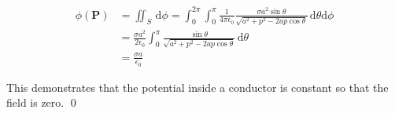 \documentclass[12pt]{article}
\begin{document}
\begin{equation}
\begin{split}
    \phi(\mathbf{P}) &= \iint_{S} \, \mathrm{d}\phi = \int_{0}^{2\pi} \int_{0}^{\pi} \frac{1}{4\pi\epsilon_{0}} \frac{\sigma a^{2} \sin{\theta}}{\sqrt{a^{2} + p^{2} - 2ap\cos{\theta}}} \, \mathrm{d}\theta \mathrm{d}\phi \\
    &= \frac{\sigma a^{2}}{2\epsilon_{0}} \int_{0}^{\pi} \frac{\sin{\theta}}{\sqrt{a^{2} + p^{2} - 2ap\cos{\theta}}} \, \mathrm{d}\theta \\
    &= \frac{\sigma a}{\epsilon_{0}}
\end{split}
\end{equation}

This demonstrates that the potential inside a conductor is constant so that the field is zero.
\qed
\end{document}
